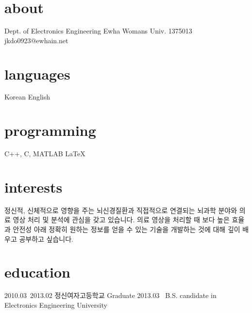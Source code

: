 \documentclass[]{friggeri-cv}
\begin{document}


\begin{aside}
%
\section{about}
Dept. of Electronics
Engineering
Ewha Womans Univ.
1375013
~
jkdo0923@ewhain.net
%
\section{languages}
Korean
English
%
\section{programming}
C++, C, MATLAB
\LaTeX{}
%
\end{aside}


\section{interests}

정신적, 신체적으로 영향을 주는 뇌신경질환과 직접적으로 연결되는 뇌과학 분야와 의료 영상 처리 및 분석에 관심을 갖고 있습니다. 의료 영상을 처리할 때 보다 높은 효율과 안전성 아래 정확히 원하는 정보를 얻을 수 있는 기술을 개발하는 것에 대해 깊이 배우고 공부하고 싶습니다.
\section{education}

\begin{entrylist}
\entry
 {2010.03~2013.02}
 {{\normalfont 정신여자고등학교}}
 {Graduate}
 {}
\entry
 {2013.03~}
 {B.S. {\normalfont candidate in Electronics Engineering}}
 {University}
 {}
\end{entrylist}
\end{document}
